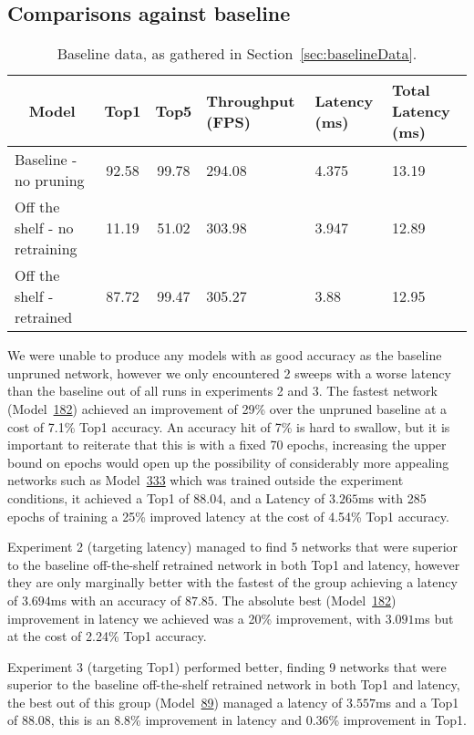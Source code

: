 \documentclass[../Dissertation.tex]{subfiles}
\begin{document}
\subsection{Comparisons against baseline}\label{sec:vsBaseline}

\begin{table}[H]
    \begin{tabular}{@{}lccp{25mm}p{23mm}p{28mm}@{}}
    \toprule
    \multicolumn{1}{c}{\textbf{Model}} & \textbf{Top1} & \textbf{Top5} & \textbf{Throughput (FPS)} & \textbf{Latency (ms)} & \textbf{Total Latency (ms)} \\ \midrule
    Baseline - no pruning              & 92.58         & 99.78         & 294.08                    & 4.375                 & 13.19                       \\
    Off the shelf - no retraining      & 11.19         & 51.02         & 303.98                    & 3.947                 & 12.89                       \\
    Off the shelf - retrained          &  87.72        & 99.47         & 305.27                    & 3.88                  & 12.95                           \\ \bottomrule
    \end{tabular}
    \caption{Baseline data, as gathered in Section~\ref{sec:baselineData}.}
\end{table}

We were unable to produce any models with as good accuracy as the baseline unpruned network, however we only encountered 2 sweeps with a worse latency than the baseline out of all runs in experiments 2 and 3.
The fastest network (Model~\hyperref[sec:unique-sweep-182]{182}) achieved an improvement of 29\% over the unpruned baseline at a cost of 7.1\% Top1 accuracy.
An accuracy hit of 7\% is hard to swallow, but it is important to reiterate that this is with a fixed 70 epochs, increasing the upper bound on epochs would open up the possibility of considerably more appealing networks such as Model~\hyperref[sec:fiery-sweep-333]{333} which was trained outside the experiment conditions, it achieved a Top1 of 88.04, and a Latency of $3.265$ms with 285 epochs of training a 25\% improved latency at the cost of 4.54\% Top1 accuracy.

Experiment 2 (targeting latency) managed to find 5 networks that were superior to the baseline off-the-shelf retrained network in both Top1 and latency, however they are only marginally better with the fastest of the group achieving a latency of $3.694$ms with an accuracy of $87.85$. 
The absolute best (Model~\hyperref[sec:unique-sweep-182]{182}) improvement in latency we achieved was a 20\% improvement, with $3.091$ms but at the cost of 2.24\% Top1 accuracy.

Experiment 3 (targeting Top1) performed better, finding 9 networks that were superior to the baseline off-the-shelf retrained network in both Top1 and latency, the best out of this group (Model~\hyperref[sec:rural-sweep-89]{89}) managed a latency of $3.557$ms and a Top1 of $88.08$, this is an 8.8\% improvement in latency and 0.36\% improvement in Top1.
\end{document}
